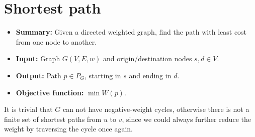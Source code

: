 \section{Shortest path} \label{algorithm-shortestpath}
\begin{itemize}
    \item \textbf{Summary:} Given a directed weighted graph, find the path with least cost from one node to another.
    \item \textbf{Input:} Graph $G(V,E,w)$ and origin/destination nodes $s, d \in V$.
    \item \textbf{Output:} Path $p \in P_G$, starting in $s$ and ending in $d$.
    \item \textbf{Objective function:} $\min W(p)$.
\end{itemize}
It is trivial that $G$ can not have negative-weight cycles, otherwise there is not a finite set of shortest paths from $u$ to $v$, since we could always further reduce the weight by traversing the cycle once again.



